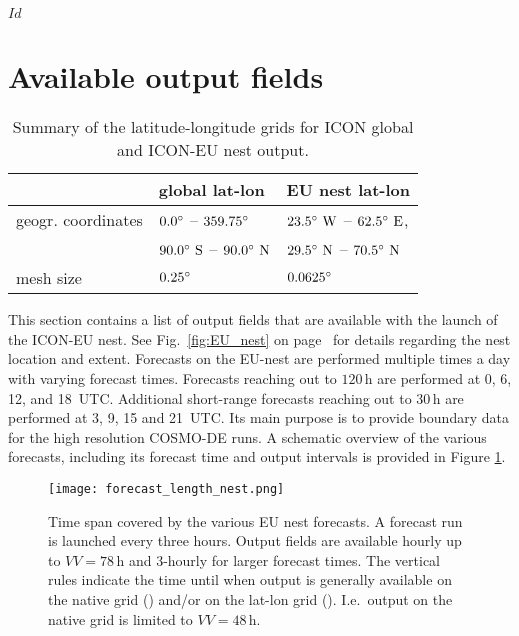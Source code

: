 \svnInfo $Id$


\section{Available output fields}\label{nest:sec_outfields}

\begin{table}[t]
  \centering
  \begin{tabular}{|p{5cm}|p{4.5cm}|p{4.5cm}|}\hline
    \rowcolor{Gray}
                               &    {\centering\textbf{global lat-lon}}          &     {\centering\textbf{EU nest lat-lon}} \\ \hline\hline
    geogr. coordinates         &    $  0.0^{\circ}$          -- $359.75^{\circ}$                     &     $ 23.5^{\circ}~\text{W}$ -- $62.5^{\circ}~\text{E}$, \\
                               &    $ 90.0^{\circ}~\text{S}$ -- $ 90.0^{\circ}~\text{N}$              &     $ 29.5^{\circ}~\text{N}$ -- $70.5^{\circ}~\text{N}$ \\
    mesh size                  &    $0.25^{\circ}$                                &     $0.0625^{\circ}$ \\
    \hline
  \end{tabular}
  \caption{Summary of the latitude-longitude grids for ICON global and ICON-EU nest output.}%
  \label{tab:ICON_latlon_summary}
\end{table}

This section contains a list of output fields that are available with
the launch of the ICON-EU nest. See Fig.~\ref{fig:EU_nest} on page~\pageref{fig:EU_nest} 
for details regarding the nest location and extent.
%
Forecasts on the EU-nest are performed multiple times a day with varying forecast times. Forecasts reaching out to $120\,\mathrm{h}$ 
are performed at 0, 6, 12, and 18~UTC. Additional short-range forecasts reaching out to $30\,\mathrm{h}$ are performed at 3, 9, 15 and 21~UTC. 
Its main purpose is to provide boundary data for the high resolution COSMO-DE runs. A schematic overview of the various forecasts, including its 
forecast time and output intervals is provided in Figure \ref{fig:forecast_length_nest}.
\begin{figure}[hbt]
 \centering
 \texttt{[image: forecast\_length\_nest.png]}
 \caption{Time span covered by the various EU nest forecasts. A forecast run is launched every three hours.
          Output fields are available hourly up to $VV=78\,\mathrm{h}$ and 3-hourly for larger forecast times. 
          The vertical rules indicate the time until when output is generally available on the native grid 
          (\protect\markRed) and/or on the lat-lon grid (\protect\markBlue). I.e.\ output on the native grid is 
          limited to $VV=48\,\mathrm{h}$.}\label{fig:forecast_length_nest}
\end{figure}

